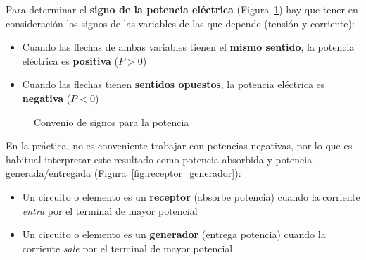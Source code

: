 	Para determinar el \textbf{signo de la potencia eléctrica}
        (Figura~\ref{fig:signo_potencia}) hay que tener en
        consideración los signos de las variables de las que depende
        (tensión y corriente):
	\begin{itemize}
        \item Cuando las flechas de ambas variables tienen el
          \textbf{mismo sentido}, la potencia eléctrica es
          \textbf{positiva} ($P>0$)
        \item Cuando las flechas tienen \textbf{sentidos opuestos}, la
          potencia eléctrica es \textbf{negativa} ($P<0$)
	\end{itemize}
	\begin{figure}[H]
          \centering
          \hfil
          \caption{Convenio de signos para la potencia}
          \label{fig:signo_potencia}
	\end{figure}
	En la práctica, no es conveniente trabajar con potencias
        negativas, por lo que es habitual interpretar este resultado
        como potencia absorbida y potencia generada/entregada
        (Figura~\ref{fig:receptor_generador}):
	\begin{itemize}
        \item Un circuito o elemento es un \textbf{receptor} (absorbe
          potencia) cuando la corriente \emph{entra} por el terminal
          de mayor potencial
        \item Un circuito o elemento es un \textbf{generador} (entrega
          potencia) cuando la corriente \emph{sale} por el terminal de
          mayor potencial
	\end{itemize}
